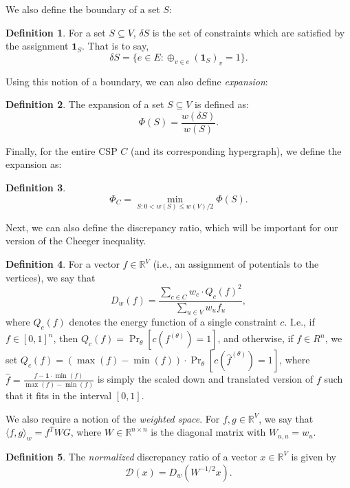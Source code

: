 \documentclass[11pt]{article}
\theoremstyle{definition}
\newtheorem{definition}{Definition}[section]
\newcommand{\R}{\mathbb{R}}
\begin{document}
We also define the boundary of a set $S$:

\begin{definition}
    For a set $S \subseteq V$, $\delta S$ is the set of constraints which are satisfied by the assignment $\mathbf{1}_S$. That is to say,
    \[
    \delta S = \{e \in E: \oplus_{v \in e} (\mathbf{1}_S)_v = 1 \}.
    \]
\end{definition}

Using this notion of a boundary, we can also define \emph{expansion}:

\begin{definition}
The expansion of a set $S \subseteq V$ is defined as: 
\[
\Phi(S) = \frac{w(\delta S)}{w(S)}.
\]
\end{definition}

Finally, for the entire CSP $C$ (and its corresponding hypergraph), we define the expansion as:

\begin{definition}
    \[
    \Phi_C = \min_{S: 0 < w(S) \leq w(V) / 2} \Phi(S).
    \]
\end{definition}

Next, we can also define the discrepancy ratio, which will be important for our version of the Cheeger inequality.  

\begin{definition}
    For a vector $f \in \R^V$ (i.e., an assignment of potentials to the vertices), we say that 
    \[
    D_w(f) = \frac{\sum_{c \in C} w_c \cdot Q_c(f)^2}{\sum_{u \in V} w_u f_u},
    \]
    where $Q_c(f)$ denotes the energy function of a single constraint $c$. I.e., if $f \in [0,1]^n$, then $Q_c(f) = \Pr_{\theta}[c(f^{(\theta)}) = 1] $, and otherwise, if $f \in R^n$, we set $Q_c(f) = (\max(f) - \min(f)) \cdot \Pr_{\theta}[c(\hat{f}^{(\theta)}) = 1]$, where $\hat{f} = \frac{f - \mathbf{1} \cdot \min(f)}{\max(f) - \min(f)}$ is simply the scaled down and translated version of $f$ such that it fits in the interval $[0,1]$.
\end{definition}

We also require a notion of the \emph{weighted space}. For $f, g \in \R^V$, we say that $\langle f, g \rangle_w = f^T W G$, where $W \in \R^{n \times n}$ is the diagonal matrix with $W_{u,u} = w_u$. 

\begin{definition}
    The \emph{normalized} discrepancy ratio of a vector $x \in \R^V$ is given by 
    \[
    \mathcal{D}(x) = D_w(W^{-1/2} x).
    \]
\end{definition}
\end{document}
